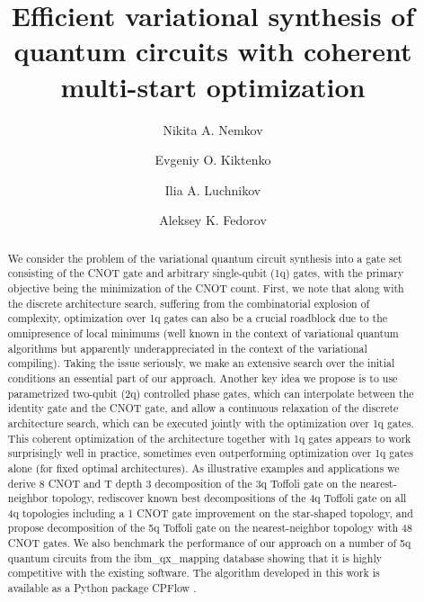 \documentclass[twocolumn, amsfonts, amssymb, aps, nofootinbib]{revtex4-2}
\newcommand{\CX}{\textsf{CNOT }}
\newcommand{\T}{\textsf{T }}
\newcommand{\package}[1]{\textrm {#1 }}
\newcommand{\cpflow}{\package{CPFlow}}
\begin{document}
\title{Efficient variational synthesis of quantum circuits with coherent multi-start optimization}

\author{Nikita A. Nemkov}
\author{Evgeniy O. Kiktenko}
\author{Ilia A. Luchnikov}
\author{Aleksey K. Fedorov}

\begin{abstract}
We consider the problem of the variational quantum circuit synthesis into a gate set consisting of the \CX gate and arbitrary single-qubit (1q) gates, with the primary objective being the minimization of the \CX count. First, we note that along with the discrete architecture search, suffering from the combinatorial explosion of complexity, optimization over 1q gates can also be a crucial roadblock due to the omnipresence of local minimums (well known in the context of variational quantum algorithms but apparently underappreciated in the context of the variational compiling). Taking the issue seriously, we make an extensive search over the initial conditions an essential part of our approach.
Another key idea we propose is to use parametrized two-qubit (2q) controlled phase gates, which can interpolate between the identity gate and the \CX gate, and allow a continuous relaxation of the discrete architecture search, which can be executed jointly with the optimization over 1q gates. This coherent optimization of the architecture together with 1q gates appears to work surprisingly well in practice, sometimes even outperforming optimization over 1q gates alone (for fixed optimal architectures).
As illustrative examples and applications we derive 8 \CX and \T depth 3 decomposition of the 3q Toffoli gate on the nearest-neighbor topology, rediscover known best decompositions of the 4q Toffoli gate on all 4q topologies including a  1 \CX gate improvement on the star-shaped topology, and propose decomposition of the 5q Toffoli gate on the nearest-neighbor topology with 48 \CX gates. We also benchmark the performance of our approach on a number of 5q quantum circuits from the ibm\_qx\_mapping database showing that it is highly competitive with the existing software. The algorithm developed in this work is available as a Python package \cpflow.
\end{abstract}
\end{document}
